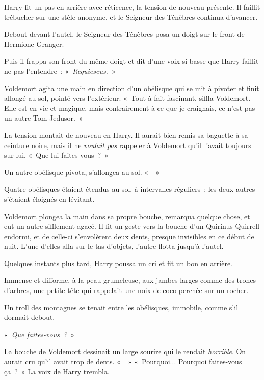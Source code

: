 Harry fit un pas en arrière avec réticence, la tension de nouveau présente. Il faillit trébucher sur une stèle anonyme, et le Seigneur des Ténèbres continua d'avancer.

Debout devant l'autel, le Seigneur des Ténèbres posa un doigt sur le front de Hermione Granger.

Puis il frappa son front du même doigt et dit d'une voix si basse que Harry faillit ne pas l'entendre~: «~\emph{Requiescus.}~»

Voldemort agita une main en direction d'un obélisque qui se mit à pivoter et finit allongé au sol, pointé vers l'extérieur. «~Tout à fait fascinant, siffla Voldemort. Elle est en vie et magique, mais contrairement à ce que je craignais, ce n'est pas un autre Tom Jedusor.~»

La tension montait de nouveau en Harry. Il aurait bien remis sa baguette à sa ceinture noire, mais il ne \emph{voulait pas} rappeler à Voldemort qu'il l'avait toujours sur lui. «~Que lui faites-vous~?~»

Un autre obélisque pivota, s'allongea au sol. «~~»

Quatre obélisques étaient étendus au sol, à intervalles réguliers~; les deux autres s'étaient éloignés en lévitant.

Voldemort plongea la main dans sa propre bouche, remarqua quelque chose, et eut un autre sifflement agacé. Il fit un geste vers la bouche d'un Quirinus Quirrell endormi, et de celle-ci s'envolèrent deux dents, presque invisibles en ce début de nuit. L'une d'elles alla sur le tas d'objets, l'autre flotta jusqu'à l'autel.

Quelques instants plus tard, Harry poussa un cri et fit un bon en arrière.

Immense et difforme, à la peau grumeleuse, aux jambes larges comme des troncs d'arbres, une petite tête qui rappelait une noix de coco perchée sur un rocher.

Un troll des montagnes se tenait entre les obélisques, immobile, comme s'il dormait debout.

«~\emph{Que faites-vous~?}~»

La bouche de Voldemort dessinait un large sourire qui le rendait \emph{horrible}. On aurait cru qu'il avait trop de dents. «~~»
«~Pourquoi... Pourquoi faites-vous ça~?~» La voix de Harry trembla.

